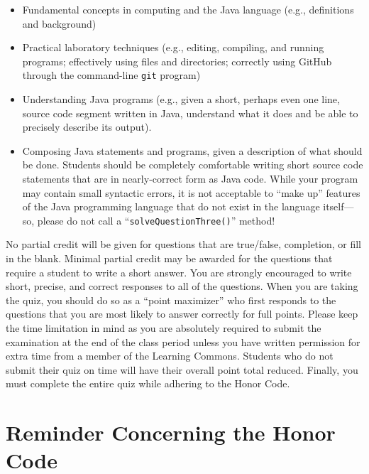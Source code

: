 \documentclass[11pt]{article}
\begin{document}
\vspace*{-.05in}
\begin{itemize}

  \itemsep 0in

\item Fundamental concepts in computing and the Java language (e.g., definitions and background)

\item Practical laboratory techniques (e.g., editing, compiling, and running programs; effectively using files and
  directories; correctly using GitHub through the command-line {\tt git} program)

\item Understanding Java programs (e.g., given a short, perhaps even one line, source code segment written in Java,
  understand what it does and be able to precisely describe its output).

\item Composing Java statements and programs, given a description of what should be done. Students should be completely
  comfortable writing short source code statements that are in nearly-correct form as Java code. While your program may
  contain small syntactic errors, it is not acceptable to ``make up'' features of the Java programming language that do
  not exist in the language itself---so, please do not call a ``{\tt solveQuestionThree()}'' method!

\end{itemize}

\noindent No partial credit will be given for questions that are true/false, completion, or fill in the blank. Minimal
partial credit may be awarded for the questions that require a student to write a short answer. You are strongly
encouraged to write short, precise, and correct responses to all of the questions. When you are taking the quiz, you
should do so as a ``point maximizer'' who first responds to the questions that you are most likely to answer correctly
for full points. Please keep the time limitation in mind as you are absolutely required to submit the examination at the
end of the class period unless you have written permission for extra time from a member of the Learning Commons.
Students who do not submit their quiz on time will have their overall point total reduced. Finally, you must complete
the entire quiz while adhering to the Honor Code.

\section*{Reminder Concerning the Honor Code}
\end{document}
